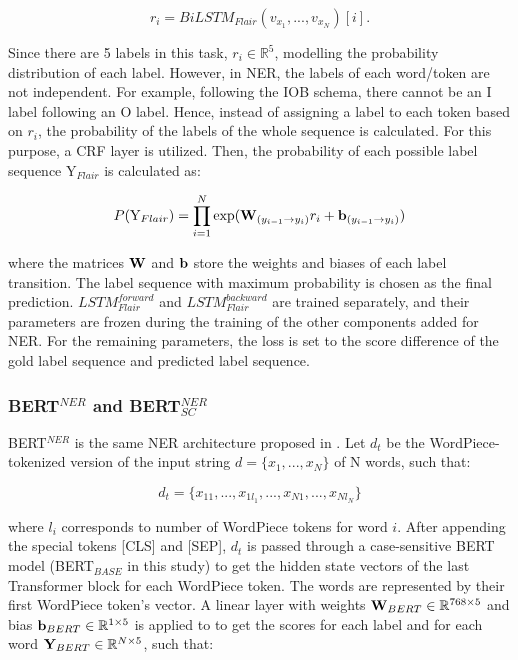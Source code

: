 \documentclass{report}
\theoremstyle{definition}
\theoremstyle{remark}
\begin{document}
\begin{equation}
    r_i = BiLSTM_{Flair}(v_{x_1},...,v_{x_N})[i].
\end{equation}

Since there are 5 labels in this task, $r_i \in \mathbb{R}^5$, modelling the probability distribution of each label. However, in NER, the labels of each word/token are not independent. For example, following the IOB schema, there cannot be an I label following an O label. Hence, instead of assigning a label to each token based on $r_i$, the probability of the labels of the whole sequence is calculated. For this purpose, a CRF layer is utilized. Then, the probability of each possible label sequence $\text{Y}_{Flair}$ is calculated as:

\begin{equation}
    P(\text{Y}_{Flair}) = \prod_{i=1}^N \text{exp}( \bold{W}_{(y_{i-1} \rightarrow y_i)}r_i + \bold{b}_{(y_{i-1} \rightarrow y_i)})
\end{equation}

\noindent where the matrices $\bold{W}$ and $\bold{b}$ store the weights and biases of each label transition. The label sequence with maximum probability is chosen as the final prediction. $LSTM^{forward}_{Flair}$ and $LSTM^{backward}_{Flair}$ are trained separately, and their parameters are frozen during the training of the other components added for NER. For the remaining parameters, the loss is set to the score difference of the gold label sequence and predicted label sequence.

\subsubsection{BERT$^{NER}$ and BERT$^{NER}_{SC}$}
BERT$^{NER}$ is the same NER architecture proposed in \cite{BERT}. Let $d_t$ be the WordPiece-tokenized version of the input string $d=\{x_1,...,x_N\}$ of N words, such that:

\begin{equation}
    d_t = \{x_{11},...,x_{1l_{1}},...,x_{N1},...,x_{Nl_{N}}\}
\end{equation}

\noindent where $l_i$ corresponds to number of WordPiece tokens for word $i$. After appending the special tokens [CLS] and [SEP], $d_t$ is passed through a case-sensitive BERT model (BERT$_{BASE}$ in this study) to get the hidden state vectors of the last Transformer block for each WordPiece token. The words are represented by their first WordPiece token's vector. A linear layer with weights $\bold{W}_{BERT} \in \mathbb{R}^{768\times5}$ and bias $\bold{b}_{BERT} \in \mathbb{R}^{1\times5}$ is applied to to get the scores for each label and for each word $\bold{Y}_{BERT} \in \mathbb{R}^{N\times5}$, such that:
\end{document}
